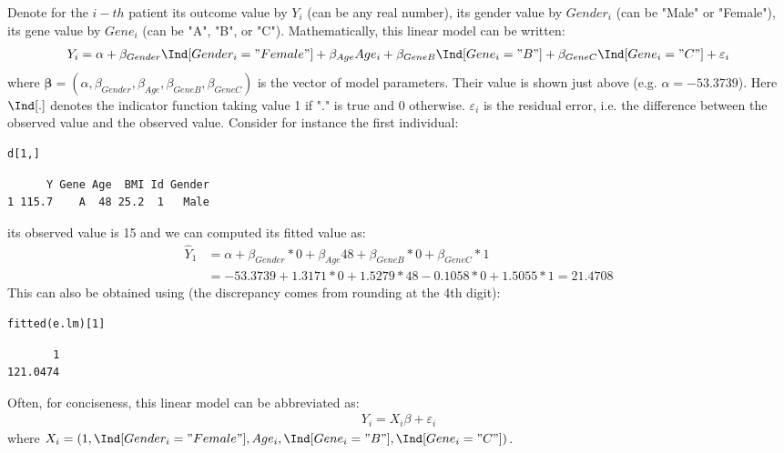 \documentclass[12pt]{article}
\begin{document}
Denote for the \(i-th\) patient its outcome value by \(Y_i\) (can be
any real number), its gender value by \(Gender_i\) (can be "Male" or
"Female"), its gene value by \(Gene_i\) (can be "A", "B", or
"C"). Mathematically, this linear model can be written:
\begin{align*}
Y_i = \alpha + \beta_{Gender} \Ind[Gender_i="Female"] + \beta_{Age} Age_i + \beta_{GeneB} \Ind[Gene_i="B"] + \beta_{GeneC} \Ind[Gene_i="C"] + \varepsilon_i
\end{align*}
where \(\boldsymbol{\beta} =
(\alpha,\beta_{Gender},\beta_{Age},\beta_{GeneB},\beta_{GeneC})\) is
the vector of model parameters. Their value is shown just above
(e.g. \(\alpha=-53.3739\)). Here \(\Ind[.]\) denotes the indicator
function taking value 1 if "." is true and 0
otherwise. \(\varepsilon_i\) is the residual error, i.e. the
difference between the observed value and the observed value. Consider
for instance the first individual:
\lstset{language=r,label= ,caption= ,captionpos=b,numbers=none}
\begin{lstlisting}
d[1,]
\end{lstlisting}

\begin{verbatim}
      Y Gene Age  BMI Id Gender
1 115.7    A  48 25.2  1   Male
\end{verbatim}
its observed value is 15 and we can computed its fitted value as:
\begin{align*}
\hat{Y}_1 &= \alpha + \beta_{Gender} * 0 + \beta_{Age} 48 + \beta_{GeneB} * 0 + \beta_{GeneC} * 1 \\
          &= -53.3739 + 1.3171 * 0 + 1.5279 * 48 - 0.1058 * 0 + 1.5055 * 1 = 21.4708
\end{align*}
This can also be obtained using (the discrepancy comes from rounding
at the 4th digit):
\lstset{language=r,label= ,caption= ,captionpos=b,numbers=none}
\begin{lstlisting}
fitted(e.lm)[1]
\end{lstlisting}

\begin{verbatim}
       1 
121.0474
\end{verbatim}

Often, for conciseness, this linear model can be abbreviated as:
\begin{align*}
Y_i = X_i \beta + \varepsilon_i
\end{align*}
where \(X_i = \left(1, \Ind[Gender_i="Female"], Age_i,
\Ind[Gene_i="B"], \Ind[Gene_i="C"]\right)\).
\end{document}
